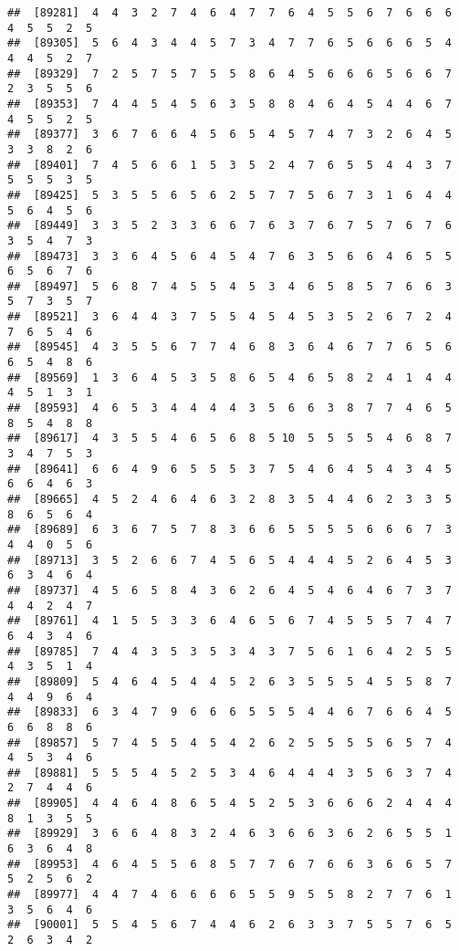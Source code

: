 \documentclass[
]{book}
\begin{document}
\begin{verbatim}
##  [89281]  4  4  3  2  7  4  6  4  7  7  6  4  5  5  6  7  6  6  6  4  5  5  2  5
##  [89305]  5  6  4  3  4  4  5  7  3  4  7  7  6  5  6  6  6  5  4  4  4  5  2  7
##  [89329]  7  2  5  7  5  7  5  5  8  6  4  5  6  6  6  5  6  6  7  2  3  5  5  6
##  [89353]  7  4  4  5  4  5  6  3  5  8  8  4  6  4  5  4  4  6  7  4  5  5  2  5
##  [89377]  3  6  7  6  6  4  5  6  5  4  5  7  4  7  3  2  6  4  5  3  3  8  2  6
##  [89401]  7  4  5  6  6  1  5  3  5  2  4  7  6  5  5  4  4  3  7  5  5  5  3  5
##  [89425]  5  3  5  5  6  5  6  2  5  7  7  5  6  7  3  1  6  4  4  5  6  4  5  6
##  [89449]  3  3  5  2  3  3  6  6  7  6  3  7  6  7  5  7  6  7  6  3  5  4  7  3
##  [89473]  3  3  6  4  5  6  4  5  4  7  6  3  5  6  6  4  6  5  5  6  5  6  7  6
##  [89497]  5  6  8  7  4  5  5  4  5  3  4  6  5  8  5  7  6  6  3  5  7  3  5  7
##  [89521]  3  6  4  4  3  7  5  5  4  5  4  5  3  5  2  6  7  2  4  7  6  5  4  6
##  [89545]  4  3  5  5  6  7  7  4  6  8  3  6  4  6  7  7  6  5  6  6  5  4  8  6
##  [89569]  1  3  6  4  5  3  5  8  6  5  4  6  5  8  2  4  1  4  4  4  5  1  3  1
##  [89593]  4  6  5  3  4  4  4  4  3  5  6  6  3  8  7  7  4  6  5  8  5  4  8  8
##  [89617]  4  3  5  5  4  6  5  6  8  5 10  5  5  5  5  4  6  8  7  3  4  7  5  3
##  [89641]  6  6  4  9  6  5  5  5  3  7  5  4  6  4  5  4  3  4  5  6  6  4  6  3
##  [89665]  4  5  2  4  6  4  6  3  2  8  3  5  4  4  6  2  3  3  5  8  6  5  6  4
##  [89689]  6  3  6  7  5  7  8  3  6  6  5  5  5  5  6  6  6  7  3  4  4  0  5  6
##  [89713]  3  5  2  6  6  7  4  5  6  5  4  4  4  5  2  6  4  5  3  6  3  4  6  4
##  [89737]  4  5  6  5  8  4  3  6  2  6  4  5  4  6  4  6  7  3  7  4  4  2  4  7
##  [89761]  4  1  5  5  3  3  6  4  6  5  6  7  4  5  5  5  7  4  7  6  4  3  4  6
##  [89785]  7  4  4  3  5  3  5  3  4  3  7  5  6  1  6  4  2  5  5  4  3  5  1  4
##  [89809]  5  4  6  4  5  4  4  5  2  6  3  5  5  5  4  5  5  8  7  4  4  9  6  4
##  [89833]  6  3  4  7  9  6  6  6  5  5  5  4  4  6  7  6  6  4  5  6  6  8  8  6
##  [89857]  5  7  4  5  5  4  5  4  2  6  2  5  5  5  5  6  5  7  4  4  5  3  4  6
##  [89881]  5  5  5  4  5  2  5  3  4  6  4  4  4  3  5  6  3  7  4  2  7  4  4  6
##  [89905]  4  4  6  4  8  6  5  4  5  2  5  3  6  6  6  2  4  4  4  8  1  3  5  5
##  [89929]  3  6  6  4  8  3  2  4  6  3  6  6  3  6  2  6  5  5  1  6  3  6  4  8
##  [89953]  4  6  4  5  5  6  8  5  7  7  6  7  6  6  3  6  6  5  7  5  2  5  6  2
##  [89977]  4  4  7  4  6  6  6  6  5  5  9  5  5  8  2  7  7  6  1  3  5  6  4  6
##  [90001]  5  5  4  5  6  7  4  4  6  2  6  3  3  7  5  5  7  6  5  2  6  3  4  2

\end{verbatim}
\end{document}
